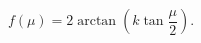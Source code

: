 \begin{equation}
\label{conformal}
f(\mu) = 2 \arctan \left( k \tan \frac{\mu}{2} \right).
\end{equation}

